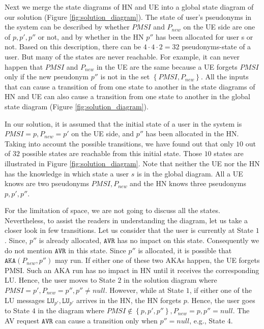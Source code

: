 \documentclass{llncs} %
\begin{document}
Next we merge the state diagrams of HN and UE into a global state diagram of our solution (Figure \ref{fig:solution_diagram}). The state of user's pseudonyms in the system can be described by whether $PMSI$ and $P_{new}$ on the UE side are one of $p, p', p''$ or not, and by whether in the HN $p''$ has been allocated for user s or not. Based on this description, there can be $4\cdot4\cdot2 = 32$ pseudonyms-state of a user. But many of the states are never reachable. For example, it can never happen that $PMSI$ and $P_{new}$ in the UE are the same because a UE forgets $PMSI$ only if the new pseudonym $p''$ is not in the set $\left\lbrace PMSI,P_{new} \right\rbrace$. All the inputs that can cause a transition of from one state to another in the state diagrams of HN and UE can also cause a transition from one state to another in the global state diagram (Figure \ref{fig:solution_diagram}). 

In our solution, it is assumed that the initial state of a user in the system is $PMSI=p, P_{new}=p'$ on the UE side, and $p''$ has been allocated in the HN. Taking into account the possible transitions, we have found out that only $10$ out of $32$ possible states are reachable from this initial state. Those $10$ states are illustrated in Figure \ref{fig:solution_diagram}. Note that neither the UE nor the HN has the knowledge in which state a user $s$ is in the global diagram. All a UE knows are two pseudonyms $PMSI,P_{new}$ and the HN knows three pseudonyms $p,p',p''$. 

For the limitation of space, we are not going to discuss all the states. Nevertheless, to assist the readers in understanding the diagram, let us take a closer look in few transitions. Let us consider that the user is currently at State $1$. Since, $p''$ is already allocated, $\texttt{AVR}$ has no impact on this state. Consequently we do not mention $\texttt{AVR}$ in this state. Since $p''$ is allocated, it is possible that $\texttt{AKA}(P_{new},p'')$ may run. If either one of these two AKAs happen, the UE forgets PMSI. Such an AKA run has no impact in HN until it receives the corresponding LU. Hence, the user moves to State $2$ in the solution diagram where $PMSI = p', P_{new} = p'', p'' \neq null$. However, while at State $1$, if either one of the LU messages $\texttt{LU}_{p'}, \texttt{LU}_{p'}$ arrives in the HN, the HN forgets $p$. Hence, the user goes to State $4$ in the diagram where $PMSI \notin \left\lbrace p,p',p'' \right\rbrace, P_{new} = p, p'' = null$. The AV request $\texttt{AVR}$ can cause a transition only when $p''=null$, e.g., State $4$.
\end{document}
